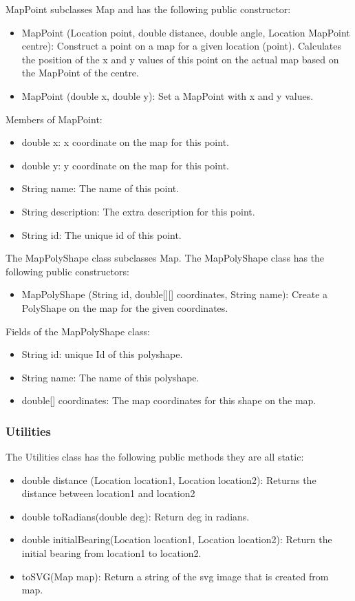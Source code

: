 \documentclass[11pt,twoside,a4paper]{article}
\begin{document}
MapPoint subclasses Map and has the following public constructor:
\begin{itemize}
\item MapPoint (Location point, double distance, double angle, Location
  MapPoint centre): Construct a point on a map for a given location
  (point). Calculates the position of the x and y values of this point
  on the actual map based on the MapPoint of the centre.
\item MapPoint (double x, double y): Set a MapPoint with x and y values.
\end{itemize}
Members of MapPoint:
\begin{itemize}
\item double x: x coordinate on the map for this point.
\item double y: y coordinate on the map for this point.
\item String name: The name of this point.
\item String description: The extra description for this point.
\item String id: The unique id of this point. 
\end{itemize}

The MapPolyShape class subclasses Map.
The MapPolyShape class has the following public constructors:
\begin{itemize}
\item MapPolyShape (String id, double[][] coordinates, String name):
  Create a PolyShape on the map for the given coordinates. 
\end{itemize}
Fields of the MapPolyShape class:
\begin{itemize}
\item String id: unique Id of this polyshape.
\item String name: The name of this polyshape.
\item double[] coordinates: The map coordinates for this shape on the map.
\end{itemize}

\subsubsection{Utilities}
The Utilities class has the following public methods they are all static:
\begin{itemize}
\item double distance (Location location1, Location location2): Returns
  the distance between location1 and location2
\item double toRadians(double deg): Return deg in radians.
\item double initialBearing(Location location1, Location location2): Return the
  initial bearing from location1 to location2.
\item toSVG(Map map): Return a string of the svg image that is created
  from map.
\end{itemize}
\end{document}
